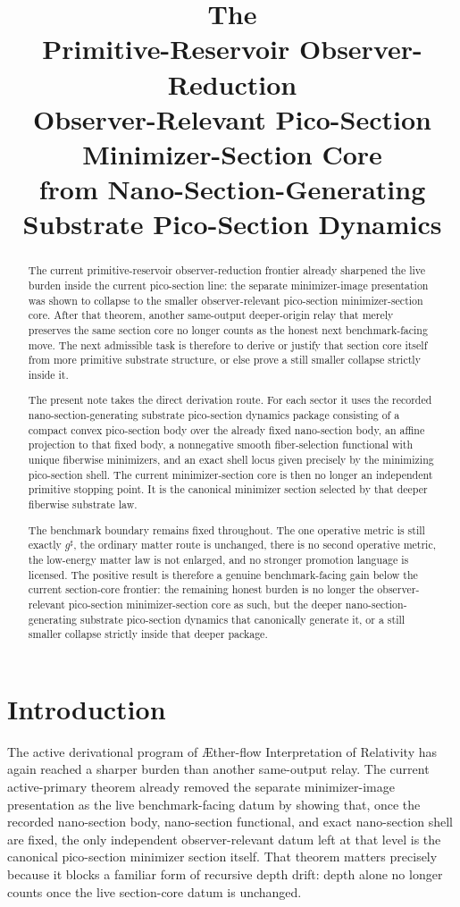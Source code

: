 \documentclass[11pt]{article}
\title{\textbf{The \TheoryName{}}\\[0.4em]
\large Primitive-Reservoir Observer-Reduction\\
\large Observer-Relevant Pico-Section Minimizer-Section Core\\
\large from Nano-Section-Generating Substrate Pico-Section Dynamics}
\author{}
\date{}
\newcommand{\Aflow}{\AE{}ther-flow}
\newcommand{\TheoryName}{\Aflow{} Interpretation of Relativity}
\newcommand{\CompletedMetric}{g^{\sharp}}
\begin{document}
\maketitle

\begin{abstract}
The current primitive-reservoir observer-reduction frontier already sharpened the live burden inside the current pico-section line: the separate minimizer-image presentation was shown to collapse to the smaller observer-relevant pico-section minimizer-section core. After that theorem, another same-output deeper-origin relay that merely preserves the same section core no longer counts as the honest next benchmark-facing move. The next admissible task is therefore to derive or justify that section core itself from more primitive substrate structure, or else prove a still smaller collapse strictly inside it.

The present note takes the direct derivation route. For each sector it uses the recorded nano-section-generating substrate pico-section dynamics package consisting of a compact convex pico-section body over the already fixed nano-section body, an affine projection to that fixed body, a nonnegative smooth fiber-selection functional with unique fiberwise minimizers, and an exact shell locus given precisely by the minimizing pico-section shell. The current minimizer-section core is then no longer an independent primitive stopping point. It is the canonical minimizer section selected by that deeper fiberwise substrate law.

The benchmark boundary remains fixed throughout. The one operative metric is still exactly \(\CompletedMetric\), the ordinary matter route is unchanged, there is no second operative metric, the low-energy matter law is not enlarged, and no stronger promotion language is licensed. The positive result is therefore a genuine benchmark-facing gain below the current section-core frontier: the remaining honest burden is no longer the observer-relevant pico-section minimizer-section core as such, but the deeper nano-section-generating substrate pico-section dynamics that canonically generate it, or a still smaller collapse strictly inside that deeper package.
\end{abstract}

\section{Introduction}

The active derivational program of \TheoryName{} has again reached a sharper burden than another same-output relay. The current active-primary theorem already removed the separate minimizer-image presentation as the live benchmark-facing datum by showing that, once the recorded nano-section body, nano-section functional, and exact nano-section shell are fixed, the only independent observer-relevant datum left at that level is the canonical pico-section minimizer section itself. That theorem matters precisely because it blocks a familiar form of recursive depth drift: depth alone no longer counts once the live section-core datum is unchanged.
\end{document}
